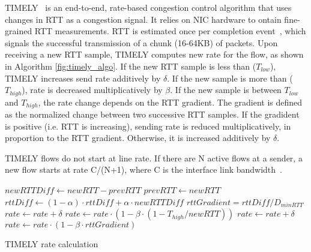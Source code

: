 TIMELY~\cite{timely} is an end-to-end, rate-based congestion control algorithm
that uses changes in RTT as a congestion signal.  It relies on NIC hardware to
ontain fine-grained RTT measurements. RTT is estimated once per completion
event~\cite{rocev2}, which signals the successful transmission of a chunk
(16-64KB) of packets. Upon receiving a new RTT sample, TIMELY computes new rate
for the flow, as shown in Algorithm \ref{fig:timely_algo}.  If the new RTT
sample is less than ($T_{low}$), TIMELY increases send rate additively by
$\delta$. If the new sample is more than ($T_{high}$), rate is decreased
multiplicatively by $\beta$. If the new sample is between $T_{low}$ and
$T_{high}$, the rate change depends on the RTT gradient. The gradient is defined
as the normalized change between two successive RTT samples. If the gradident is
positive (i.e. RTT is increasing), sending rate is reduced multiplicatively, in
proportion to the RTT gradient.  Otherwise, it is increased additively by
$\delta$.

TIMELY flows do not start at line rate. If there are N active flows at a sender,
a new flow starts at rate C/(N+1), where C is the interface link
bandwidth~\cite{timely}.

\begin{algorithm}[t]
\footnotesize
{
\begin{algorithmic}[1]
\State $newRTTDiff \gets newRTT - prevRTT$
\State $prevRTT \gets newRTT$
\State $rttDiff \gets (1-\alpha) \cdot rttDiff + \alpha \cdot newRTTDiff$
\State $rttGradient = rttDiff/D_{minRTT}$
        \State $rate \gets rate + \delta$
        \State $rate \gets rate \cdot  (1 - \beta \cdot (1 - T_{high}/newRTT))$
        \State $rate \gets rate + \delta$
\Else
        \State $rate \gets rate \cdot (1 - \beta \cdot rttGradient)$
\EndIf 
\end{algorithmic}
}
\caption{TIMELY rate calculation}
\label{fig:timely_algo}
\end{algorithm}
